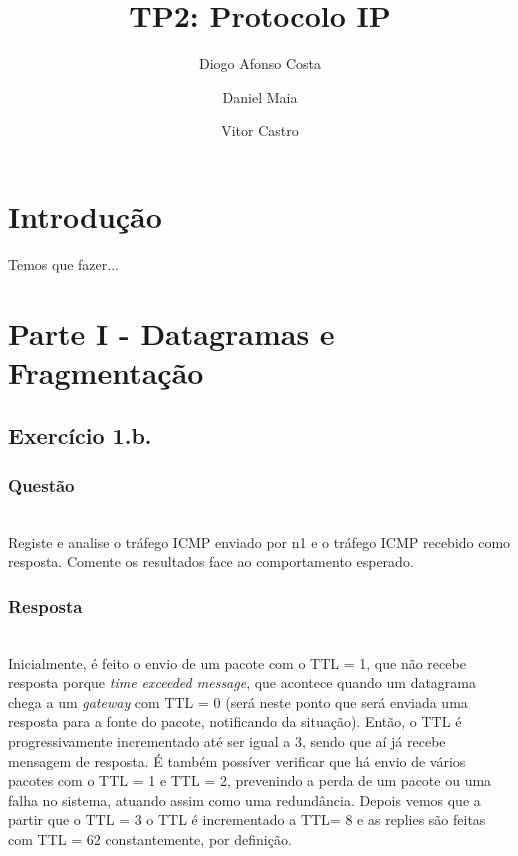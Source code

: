 \documentclass{llncs}
\begin{document}
\mainmatter
\title{TP2: Protocolo IP}


\author{Diogo Afonso Costa \and Daniel Maia \and Vitor Castro}




\date{}


\maketitle
\section{Introdução}
Temos que fazer...

\section{Parte I - Datagramas e Fragmentação}

\subsection{Exercício 1.b.}
\subsubsection{Questão}\rule[-10pt]{0pt}{10pt}\\

Registe e analise o tráfego ICMP enviado por n1 e o tráfego ICMP recebido como resposta. Comente os resultados face ao comportamento esperado.

\subsubsection{Resposta}\rule[-10pt]{0pt}{10pt}\\

Inicialmente, é feito o envio de um pacote com o TTL = 1, que não recebe resposta porque \textit{time exceeded message}, que acontece quando um datagrama chega a um \textit{gateway} com TTL = 0 (será neste ponto que será enviada uma resposta para a fonte do pacote, notificando da situação). Então, o TTL é progressivamente incrementado até ser igual a 3, sendo que aí já recebe mensagem de resposta. É também possíver verificar que há envio de vários pacotes com o TTL = 1 e TTL = 2, prevenindo a perda de um pacote ou uma falha no sistema, atuando assim como uma redundância. Depois vemos que a partir que o TTL = 3 o TTL é incrementado a TTL= 8 e as replies são feitas com TTL = 62 constantemente, por definição.
\end{document}
